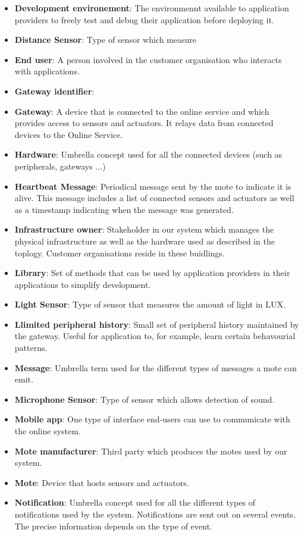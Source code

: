 \documentclass[english,peerreview]{sareport}
\begin{document}
\begin{itemize}
	\item \textbf{Development environement}: The environmennt available to application providers to freely test and debug their application before deploying it.
	\item \textbf{Distance Sensor}: Type of sensor which measure 
	\item \textbf{End user}: A person involved in the customer organisation who interacts with applications.
	\item \textbf{Gateway identifier}: 
	\item \textbf{Gateway}: A device that is connected to the online service and which provides access to sensors and actuators. It relays data from connected devices to the Online Service.
	\item \textbf{Hardware}: Umbrella concept used for all the connected devices (such as peripherals, gateways ...)
	\item \textbf{Heartbeat Message}: Periodical message sent by the mote to indicate it is alive. This message includes a list of connected sensors and actuators as well as a timestamp indicating when the message was generated.
	\item \textbf{Infrastructure owner}: Stakeholder in our system which manages the physical infrastructure as well as the hardware used as described in the toplogy. Customer organisations reside in these buidlings.
	\item \textbf{Library}: Set of methods that can be used by application providers in their applications to simplify development.
	\item \textbf{Light Sensor}: Type of sensor that measures the amount of light in LUX.
	\item \textbf{Llimited peripheral history}: Small set of peripheral history maintained by the gateway. Useful for application to, for example, learn certain behavourial patterns.
	\item \textbf{Message}: Umbrella term used for the different types of messages a mote can emit.
	\item \textbf{Microphone Sensor}: Type of sensor which allows detection of sound. 
	\item \textbf{Mobile app}: One type of interface end-users can use to communicate with the online system.
	\item \textbf{Mote manufacturer}: Third party which produces the motes used by our system.
	\item \textbf{Mote}: Device that hosts sensors and actuators.
	\item \textbf{Notification}: Umbrella concept used for all the different types of notifications used by the system. Notifications are sent out on several events. The precise information depends on the type of event.

\end{itemize}
\end{document}
